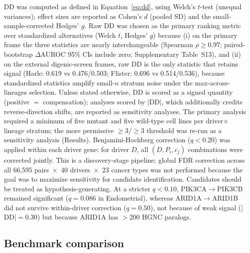 \documentclass[11pt,a4paper]{article}
\begin{document}
DD was computed as defined in Equation~\ref{eq:dd}, using Welch's $t$-test (unequal variances); effect sizes are reported as Cohen's $d$ (pooled SD) and the small-sample-corrected Hedges' $g$. Raw DD was chosen as the primary ranking metric over standardized alternatives (Welch $t$, Hedges' $g$) because (i) on the primary frame the three statistics are nearly interchangeable (Spearman $\rho \ge 0.97$; paired-bootstrap $\Delta$AUROC 95\% CIs include zero; Supplementary Table~S13), and (ii) on the external digenic-screen frames, raw DD is the only statistic that retains signal (Harle: 0.619 vs 0.476/0.503; Flister: 0.696 vs 0.514/0.536), because standardized statistics amplify small-$n$ stratum noise under the max-across-lineages selection. Unless stated otherwise, DD is scored as a signed quantity (positive $=$ compensation); analyses scored by $|$DD$|$, which additionally credits reverse-direction shifts, are reported as sensitivity analyses. The primary analysis required a minimum of five mutant and five wild-type cell lines per driver$\times$lineage stratum; the more permissive $\ge$3/$\ge$3 threshold was re-run as a sensitivity analysis (Results). Benjamini-Hochberg correction \cite{Benjamini1995} ($q<0.20$) was applied within each driver gene: for driver $D$, all $(D, P_i, c_j)$ combinations were corrected jointly. This is a discovery-stage pipeline; global FDR correction across all 66,595 pairs~$\times$~40 drivers~$\times$~23 cancer types was not performed because the goal was to maximize sensitivity for candidate identification. Candidates should be treated as hypothesis-generating. At a stricter $q<0.10$, PIK3CA$\rightarrow$PIK3CB remained significant ($q=0.086$ in Endometrial), whereas ARID1A$\rightarrow$ARID1B did not survive within-driver correction ($q=0.50$), not because of weak signal ($|$DD$| = 0.30$) but because ARID1A has $>$200 HGNC paralogs.

\subsection*{Benchmark comparison}
\end{document}
